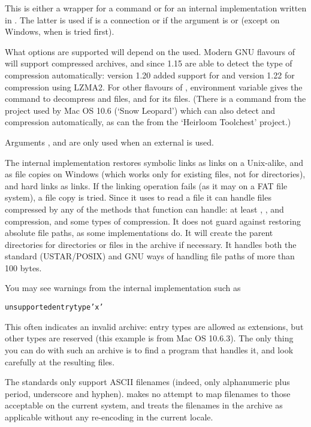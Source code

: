 %
\begin{Details}\relax
This is either a wrapper for a  command or for an
internal implementation written in \R{}.  The latter is used if
 is a connection or if the argument  is
 or  (except on Windows, when
 is tried first).

What options are supported will depend on the  used.
Modern GNU flavours of  will support compressed archives,
and since 1.15 are able to detect the type of compression
automatically: version 1.20 added support for  and
version 1.22 for  compression using LZMA2.  For other
flavours of , environment variable  gives
the command to decompress  and  files,
and  for its files.  (There is a 
command from the  project used by Mac OS 10.6
(`Snow Leopard') which can also detect  and
 compression automatically, as can the 
from the `Heirloom Toolchest' project.)

Arguments ,  and  are only
used when an external  is used.

The internal implementation restores symbolic links as links on a
Unix-alike, and as file copies on Windows (which works only for
existing files, not for directories), and hard links as links.  If the
linking operation fails (as it may on a FAT file system), a file copy
is tried.  Since it uses  to read a file it can
handle files compressed by any of the methods that function can
handle: at least , , 
and  compression, and some types of 
compression.  It does not guard against restoring absolute file paths,
as some  implementations do.  It will create the parent
directories for directories or files in the archive if necessary.  It
handles both the standard (USTAR/POSIX) and GNU ways of handling file
paths of more than 100 bytes.

You may see warnings from the internal implementation such as
\begin{alltt}unsupported entry type 'x'\end{alltt}

This often indicates an invalid archive: entry types  are
allowed as extensions, but other types are reserved (this example is
from Mac OS 10.6.3).  The only thing you can do with such an archive
is to find a  program that handles it, and look carefully at
the resulting files.

The standards only support ASCII filenames (indeed, only alphanumeric
plus period, underscore and hyphen).   makes no attempt to map
filenames to those acceptable on the current system, and treats the
filenames in the archive as applicable without any re-encoding in the
current locale.
\end{Details}
